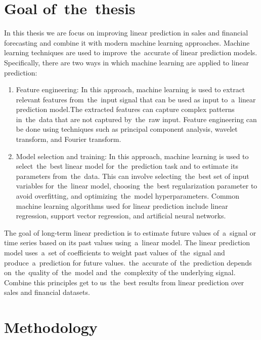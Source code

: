 \chapter{Goal of~the~thesis}\label{sec:goal}
In this thesis we are focus on improving linear prediction in sales and financial forecasting and combine it with
modern machine learning approaches. Machine learning techniques are used to improve~the~accurate of linear
prediction models. Specifically, there are two ways in which machine learning are applied to linear prediction:
\begin{enumerate}
    \item Feature engineering: In this approach, machine learning is used to extract relevant features from~the~input
    signal that can be used as input to~a~linear prediction model.The extracted features can capture complex patterns
    in~the~data that are not captured by~the~raw input. Feature engineering can be done using techniques such as
    principal component analysis, wavelet transform, and Fourier transform.
    \item Model selection and training: In this approach, machine learning is used to select~the~best linear
    model for~the~prediction task and to estimate its parameters from~the~data. This can involve selecting~the~best
    set of input variables for~the~linear model, choosing~the~best regularization parameter to avoid overfitting, and
    optimizing~the~model hyperparameters. Common machine learning algorithms used for linear prediction include linear
    regression, support vector regression, and artificial neural networks.
\end{enumerate}
The goal of long-term linear prediction is to estimate future values of~a~signal or time series based on its past
values using~a~linear model.
The linear prediction model uses~a~set of coefficients to weight past values of~the~signal and produce~a~prediction for
future values.~the~accurate of~the~prediction depends on~the~quality of~the~model and~the~complexity of the
underlying signal. Combine this principles get to us~the~best results from linear prediction over
sales and financial datasets.
\chapter{Methodology}\label{sec:methodology}
